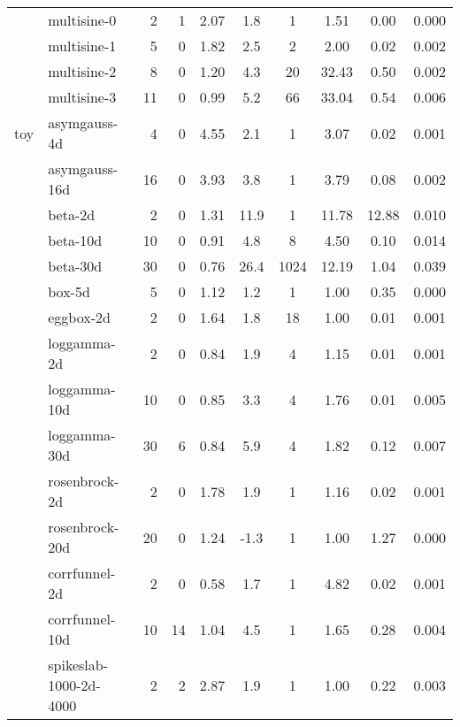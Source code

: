 \begin{tabular}{ll|rrcccccc}
                     & multisine-0          & 2   & 1    & 2.07 & 1.8 &    1 & 1.51 & 0.00 & 0.000 \\
                     & multisine-1          & 5   & 0    & 1.82 & 2.5 &    2 & 2.00 & 0.02 & 0.002 \\
                     & multisine-2          & 8   & 0    & 1.20 & 4.3 &   20 & 32.43 & 0.50 & 0.002 \\
                     & multisine-3          & 11  & 0    & 0.99 & 5.2 &   66 & 33.04 & 0.54 & 0.006 \\
\hline
toy                  & asymgauss-4d         & 4   & 0    & 4.55 & 2.1 &    1 & 3.07 & 0.02 & 0.001 \\
                     & asymgauss-16d        & 16  & 0    & 3.93 & 3.8 &    1 & 3.79 & 0.08 & 0.002 \\
                     & beta-2d              & 2   & 0    & 1.31 & 11.9 &    1 & 11.78 & 12.88 & 0.010 \\
                     & beta-10d             & 10  & 0    & 0.91 & 4.8 &    8 & 4.50 & 0.10 & 0.014 \\
                     & beta-30d             & 30  & 0    & 0.76 & 26.4 & 1024 & 12.19 & 1.04 & 0.039 \\
                     & box-5d               & 5   & 0    & 1.12 & 1.2 &    1 & 1.00 & 0.35 & 0.000 \\
                     & eggbox-2d            & 2   & 0    & 1.64 & 1.8 &   18 & 1.00 & 0.01 & 0.001 \\
                     & loggamma-2d          & 2   & 0    & 0.84 & 1.9 &    4 & 1.15 & 0.01 & 0.001 \\
                     & loggamma-10d         & 10  & 0    & 0.85 & 3.3 &    4 & 1.76 & 0.01 & 0.005 \\
                     & loggamma-30d         & 30  & 6    & 0.84 & 5.9 &    4 & 1.82 & 0.12 & 0.007 \\
                     & rosenbrock-2d        & 2   & 0    & 1.78 & 1.9 &    1 & 1.16 & 0.02 & 0.001 \\
                     & rosenbrock-20d       & 20  & 0    & 1.24 & -1.3 &    1 & 1.00 & 1.27 & 0.000 \\
                     & corrfunnel-2d        & 2   & 0    & 0.58 & 1.7 &    1 & 4.82 & 0.02 & 0.001 \\
                     & corrfunnel-10d       & 10  & 14   & 1.04 & 4.5 &    1 & 1.65 & 0.28 & 0.004 \\
                     & spikeslab-1000-2d-4000 & 2   & 2    & 2.87 & 1.9 &    1 & 1.00 & 0.22 & 0.003 \\

\end{tabular}
